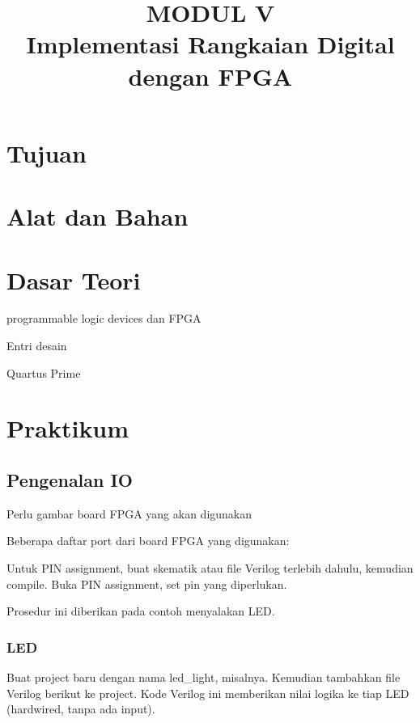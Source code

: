 \documentclass[a4paper,11pt,bahasa]{extarticle}
\begin{document}
\title{MODUL V \\
Implementasi Rangkaian Digital dengan FPGA}
\author{}
\date{}
\maketitle

\section{Tujuan}

\section{Alat dan Bahan}


\section{Dasar Teori}

programmable logic devices dan FPGA

Entri desain

Quartus Prime


\section{Praktikum}

\subsection{Pengenalan IO}

{\color{red} Perlu gambar board FPGA yang akan digunakan}

Beberapa daftar port dari board FPGA yang digunakan:



Untuk PIN assignment, buat skematik atau file Verilog terlebih dahulu, kemudian compile.
Buka PIN assignment, set pin yang diperlukan.

Prosedur ini diberikan pada contoh menyalakan LED.

\subsubsection{LED}

Buat project baru dengan nama {\sf led\_light},
misalnya. Kemudian tambahkan file Verilog berikut
ke project. Kode Verilog ini memberikan nilai logika ke tiap
LED (hardwired, tanpa ada input).
\end{document}
